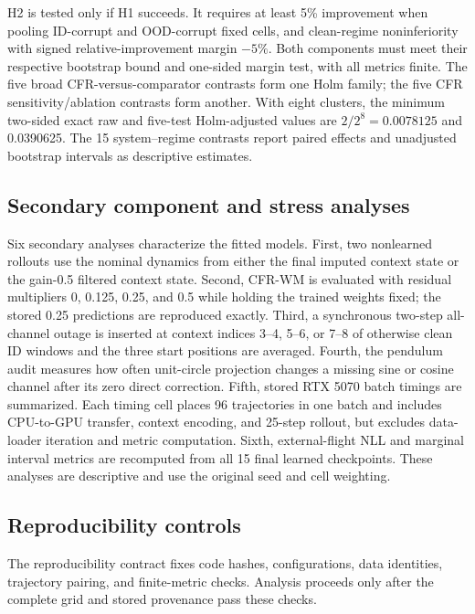 \documentclass[iicol,pdflatex,sn-basic,Numbered]{sn-jnl}
\begin{document}
H2 is tested only if H1 succeeds. It requires at least 5\% improvement when
pooling ID-corrupt and OOD-corrupt fixed cells, and clean-regime
noninferiority with signed relative-improvement margin $-5\%$. Both components
must meet their respective bootstrap bound and one-sided margin test, with all
metrics finite. The five broad CFR-versus-comparator contrasts form one Holm
family; the five CFR sensitivity/ablation contrasts form another. With eight
clusters, the minimum two-sided exact raw and five-test Holm-adjusted values are
$2/2^8=0.0078125$ and 0.0390625. The 15 system--regime contrasts report paired
effects and unadjusted bootstrap intervals as descriptive estimates.

\subsection{Secondary component and stress analyses}

Six secondary analyses characterize the fitted models. First, two nonlearned
rollouts use the nominal dynamics from either the
final imputed context state or the gain-0.5 filtered context state. Second,
CFR-WM is evaluated with residual multipliers 0, 0.125, 0.25, and 0.5 while
holding the trained weights fixed; the stored 0.25 predictions are reproduced
exactly. Third, a synchronous two-step
all-channel outage is inserted at context indices 3--4, 5--6, or 7--8 of
otherwise clean ID windows and the three start positions are averaged. Fourth,
the pendulum audit measures how often unit-circle projection changes a missing
sine or cosine channel after its zero direct correction. Fifth, stored RTX 5070
batch timings are summarized. Each timing cell places 96 trajectories in one
batch and includes CPU-to-GPU transfer, context encoding, and 25-step rollout,
but excludes data-loader iteration and metric computation. Sixth,
external-flight NLL and marginal interval metrics are recomputed from all 15
final learned checkpoints. These analyses are descriptive and use the original
seed and cell weighting.

\subsection{Reproducibility controls}

The reproducibility contract fixes code hashes, configurations, data identities,
trajectory pairing, and finite-metric checks. Analysis proceeds only after the
complete grid and stored provenance pass these checks.
\end{document}
